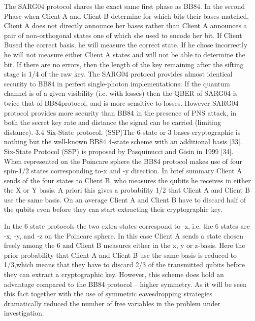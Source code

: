 The SARG04 protocol shares the exact same first phase as BB84. In the second Phase when Client A and Client B determine for which bits their bases matched, Client A does not directly announce her bases rather than Client A announces a pair of non-orthogonal states one of which she used to encode her bit. If Client Bused the correct basis, he will measure the correct state. If he chose incorrectly he will not measure either Client A states and will not be able to determine the bit. If there are no errors, then the length of the key remaining after the sifting stage is 1/4 of the raw key. The SARG04 protocol provides almost identical security to BB84 in perfect single-photon implementations: If the quantum channel is of a given visibility (i.e. with losses) then the QBER of SARG04 is twice that of BB84protocol, and is more sensitive to losses.
However SARG04 protocol provides more security than BB84 in the presence of PNS attack, in both the secret key rate and distance the signal can be carried (limiting distance).
3.4 Six-State protocol. (SSP)The 6-state or 3 bases cryptographic is nothing but the well-known BB84 4-state scheme with an additional basis [33]. Six-State Protocol (SSP) is proposed by Pasquinucci and Gisin in 1999 [34].
When represented on the Poincare sphere the BB84 protocol makes use of four spin-1/2 states corresponding to-x and -y direction. In brief summary Client A sends of the four states to Client B, who measures the qubits he receives in either the X or Y basis. A priori this gives a probability 1/2 that Client A and Client B use the same basis. On an average Client A and Client B have to discard half of the qubits even before they can start extracting their cryptographic key.

In the 6 state protocols the two extra states correspond to -z, i.e. the 6 states are -x, -y, and -z on the Poincare sphere. In this case Client A sends a state chosen freely among the 6 and Client B measures either in the x, y or z-basis. Here the prior probability that Client A and Client B use the same basis is reduced to 1/3,which means that they have to discard 2/3 of the transmitted qubits before they can extract a cryptographic key.
However, this scheme does hold an advantage compared to the BB84 protocol – higher symmetry. As it will be seen this fact together with the use of symmetric eavesdropping strategies dramatically reduced the number of free variables in the problem under investigation.
